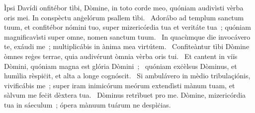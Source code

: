 { Ìpsi Davídi}
{%
onfitébor tìbi, Dòmine, in toto corde meo, quóniam audivìsti vèrba oris mei. In conspèctu anġelórum psallem tìbi. 
~Adorábo ad templum sanctum tuum, et confitébor nómini tuo, super mizericórdia tua et veritáte tua~; quóniam magnificavìsti super omne, nomen sanctum tuum. 
~In quacùmque die invocávero te, exáudi me~; multiplicábis in ànima mea virtútem. 
~Confiteàntur tìbi Dòmine òmnes reġes terrae, quia audivérunt òmnia vèrba oris tui. 
~Et cantent in viïs Dòmini, quóniam magna est glória Dòmini~; 
~quóniam exċèlsus Dòminus, et humìlia rèspiċit, et alta a longe cognóscit. 
~Si ambulávero in mèdio tribulaçiónis, vivificábis me~; super iram inimicórum meórum extendìsti mànum tuam, et sàlvum me feċit dèxtera tua. 
~Dòminus retrìbuet pro me. Dòmine, mizericórdia tua in sáeculum~; ópera mànuum tuárum ne despìċias. 
}
